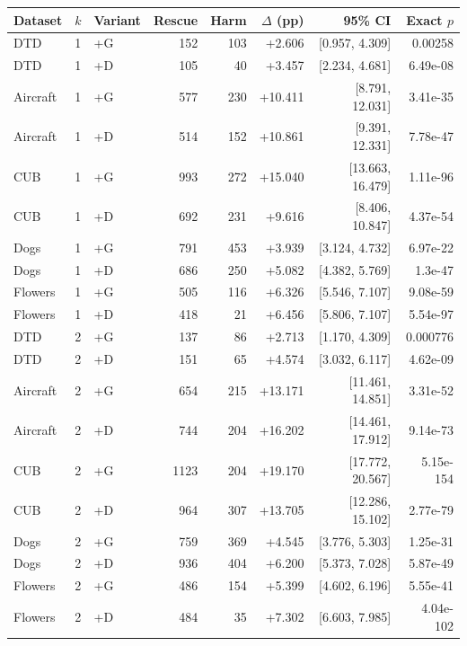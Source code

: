 \begin{tabular}{lllrrrrr}
\toprule
Dataset & $k$ & Variant & Rescue & Harm & $\Delta$ (pp) & 95\% CI & Exact $p$ \\
\midrule
DTD & 1 & +G & 152 & 103 & +2.606 & [0.957, 4.309] & 0.00258 \\
DTD & 1 & +D & 105 & 40 & +3.457 & [2.234, 4.681] & 6.49e-08 \\
Aircraft & 1 & +G & 577 & 230 & +10.411 & [8.791, 12.031] & 3.41e-35 \\
Aircraft & 1 & +D & 514 & 152 & +10.861 & [9.391, 12.331] & 7.78e-47 \\
CUB & 1 & +G & 993 & 272 & +15.040 & [13.663, 16.479] & 1.11e-96 \\
CUB & 1 & +D & 692 & 231 & +9.616 & [8.406, 10.847] & 4.37e-54 \\
Dogs & 1 & +G & 791 & 453 & +3.939 & [3.124, 4.732] & 6.97e-22 \\
Dogs & 1 & +D & 686 & 250 & +5.082 & [4.382, 5.769] & 1.3e-47 \\
Flowers & 1 & +G & 505 & 116 & +6.326 & [5.546, 7.107] & 9.08e-59 \\
Flowers & 1 & +D & 418 & 21 & +6.456 & [5.806, 7.107] & 5.54e-97 \\
DTD & 2 & +G & 137 & 86 & +2.713 & [1.170, 4.309] & 0.000776 \\
DTD & 2 & +D & 151 & 65 & +4.574 & [3.032, 6.117] & 4.62e-09 \\
Aircraft & 2 & +G & 654 & 215 & +13.171 & [11.461, 14.851] & 3.31e-52 \\
Aircraft & 2 & +D & 744 & 204 & +16.202 & [14.461, 17.912] & 9.14e-73 \\
CUB & 2 & +G & 1123 & 204 & +19.170 & [17.772, 20.567] & 5.15e-154 \\
CUB & 2 & +D & 964 & 307 & +13.705 & [12.286, 15.102] & 2.77e-79 \\
Dogs & 2 & +G & 759 & 369 & +4.545 & [3.776, 5.303] & 1.25e-31 \\
Dogs & 2 & +D & 936 & 404 & +6.200 & [5.373, 7.028] & 5.87e-49 \\
Flowers & 2 & +G & 486 & 154 & +5.399 & [4.602, 6.196] & 5.55e-41 \\
Flowers & 2 & +D & 484 & 35 & +7.302 & [6.603, 7.985] & 4.04e-102 \\
\bottomrule
\end{tabular}
